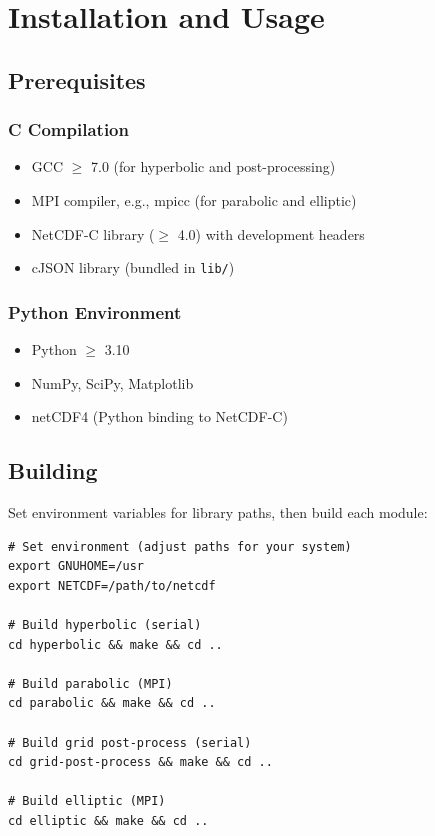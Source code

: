 \documentclass[11pt,a4paper]{report}
\begin{document}
\chapter{Installation and Usage}

\section{Prerequisites}

\subsection{C Compilation}
\begin{itemize}
    \item GCC $\geq$ 7.0 (for hyperbolic and post-processing)
    \item MPI compiler, e.g., mpicc (for parabolic and elliptic)
    \item NetCDF-C library ($\geq$ 4.0) with development headers
    \item cJSON library (bundled in \texttt{lib/})
\end{itemize}

\subsection{Python Environment}
\begin{itemize}
    \item Python $\geq$ 3.10
    \item NumPy, SciPy, Matplotlib
    \item netCDF4 (Python binding to NetCDF-C)
\end{itemize}

\section{Building}

Set environment variables for library paths, then build each module:

\begin{lstlisting}[style=bash]
# Set environment (adjust paths for your system)
export GNUHOME=/usr
export NETCDF=/path/to/netcdf

# Build hyperbolic (serial)
cd hyperbolic && make && cd ..

# Build parabolic (MPI)
cd parabolic && make && cd ..

# Build grid post-process (serial)
cd grid-post-process && make && cd ..

# Build elliptic (MPI)
cd elliptic && make && cd ..
\end{lstlisting}
\end{document}
